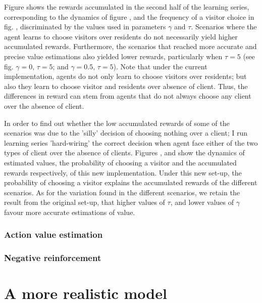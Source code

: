 \documentclass{article}
\begin{document}
Figure  shows the rewards accumulated in the second half of the learning series, corresponding to the dynamics of figure , and the frequency of a visitor choice in fig. , discriminated by the values used in parameters $\gamma$ and $\tau$. Scenarios where the agent learns to choose visitors over residents do not necessarily yield higher accumulated rewards. Furthermore, the scenarios that reached more accurate and precise value estimations also yielded lower rewards, particularly when $\tau=5$ (see fig.  $\gamma=0$, $\tau = 5$; and $\gamma=0.5$, $\tau=5$). Note that under the current implementation, agents do not only learn to choose visitors over residents; but also they learn to choose visitor and residents over absence of client. Thus, the differences in reward can stem from agents that do not always choose any client over the absence of client. 

In order to find out whether the low accumulated rewards of some of the scenarios was due to the 'silly' decision of choosing nothing over a client; I run learning series 'hard-wiring' the correct decision when agent face either of the two types of client over the absence of clients. Figures , and  show the dynamics of estimated values, the probability of choosing a visitor and the accumulated rewards respectively, of this new implementation. Under this new set-up, the probability of choosing a visitor explains the accumulated rewards of the different scenarios. As for the variation found in the different scenarios, we retain the result from the original set-up, that higher values of $\tau$, and lower values of $\gamma$ favour more accurate estimations of value. 



\subsubsection{Action value estimation}
\label{sec:actions}






\subsubsection{Negative reinforcement}




\section{A more realistic model}
\end{document}
